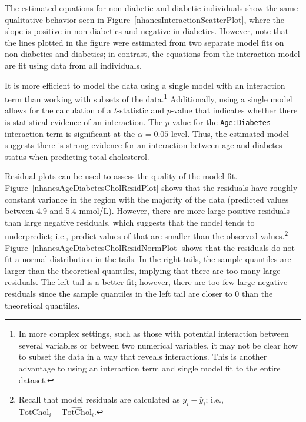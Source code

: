 \textD{\newpage}

The estimated equations for non-diabetic and diabetic individuals show the same qualitative behavior seen in Figure~\ref{nhanesInteractionScatterPlot}, where the slope is positive in non-diabetics and negative in diabetics. However, note that the lines plotted in the figure were estimated from two separate model fits on non-diabetics and diabetics; in contrast, the equations from the interaction model are fit using data from all individuals.

It is more efficient to model the data using a single model with an interaction term than working with subsets of the data.\footnote{In more complex settings, such as those with potential interaction between several variables or between two numerical variables, it may not be clear how to subset the data in a way that reveals interactions. This is another advantage to using an interaction term and single model fit to the entire dataset.} Additionally, using a single model allows for the calculation of a $t$-statistic and $p$-value that indicates whether there is statistical evidence of an interaction. The $p$-value for the \texttt{Age:Diabetes} interaction term is significant at the $\alpha = 0.05$ level. Thus, the estimated model suggests there is strong evidence for an interaction between age and diabetes status when predicting total cholesterol. 

Residual plots can be used to assess the quality of the model fit. Figure~\ref{nhanesAgeDiabetesCholResidPlot} shows that the residuals have roughly constant variance in the region with the majority of the data (predicted values between 4.9 and 5.4 mmol/L). However, there are more large positive residuals than large negative residuals, which suggests that the model tends to underpredict; i.e., predict values of  that are smaller than the observed values.\footnote{Recall that model residuals are calculated as $y_i - \hat{y}_i$; i.e., $\text{TotChol}_i - \widehat{\text{TotChol}}_i$.} Figure~\ref{nhanesAgeDiabetesCholResidNormPlot} shows that the residuals do not fit a normal distribution in the tails. In the right tails, the sample quantiles are larger than the theoretical quantiles, implying that there are too many large residuals. The left tail is a better fit; however, there are too few large negative residuals since the sample quantiles in the left tail are closer to 0 than the theoretical quantiles.

